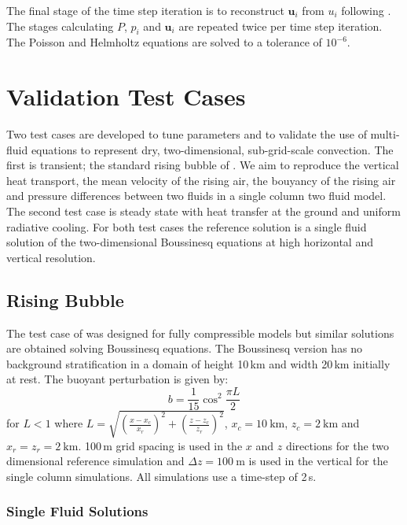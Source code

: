 \documentclass[draft]{agujournal2019}
\begin{document}
The final stage of the time step iteration is to reconstruct $\mathbf{u}_{i}$
from $u_{i}$ following . The stages calculating $P$,
$p_{i}$ and $\mathbf{u}_{i}$ are repeated twice per time step iteration.
The Poisson and Helmholtz equations are solved to a tolerance of $10^{-6}$.

\section{Validation Test Cases\label{sec:results}}

Two test cases are developed to tune parameters and to validate the
use of multi-fluid equations to represent dry, two-dimensional, sub-grid-scale
convection. The first is transient; the standard rising bubble of
. We aim to reproduce the vertical heat transport, the
mean velocity of the rising air, the bouyancy of the rising air and
pressure differences between two fluids in a single column two fluid
model. The second test case is steady state with heat transfer at
the ground and uniform radiative cooling. For both test cases the
reference solution is a single fluid solution of the two-dimensional
Boussinesq equations at high horizontal and vertical resolution. 

\subsection{Rising Bubble}

The test case of  was designed for fully compressible
models but similar solutions are obtained solving Boussinesq equations.
The Boussinesq version has no background stratification in a domain
of height 10\,km and width 20\,km initially at rest. The buoyant
perturbation is given by:
\begin{equation}
b=\frac{1}{15}\cos^{2}\frac{\pi L}{2}\label{eq:thetaPerturb}
\end{equation}
for $L<1$ where $L=\sqrt{\left(\frac{x-x_{c}}{x_{r}}\right)^{2}+\left(\frac{z-z_{c}}{z_{r}}\right)^{2}}$,
$x_{c}=10\ \text{km}$, $z_{c}=2\ \text{km}$ and $x_{r}=z_{r}=2\ \text{km}$.
100\,m grid spacing is used in the $x$ and $z$ directions for the
two dimensional reference simulation and $\Delta z=100\ \text{m}$
is used in the vertical for the single column simulations. All simulations
use a time-step of 2\,s.

\subsubsection{Single Fluid Solutions}
\end{document}
